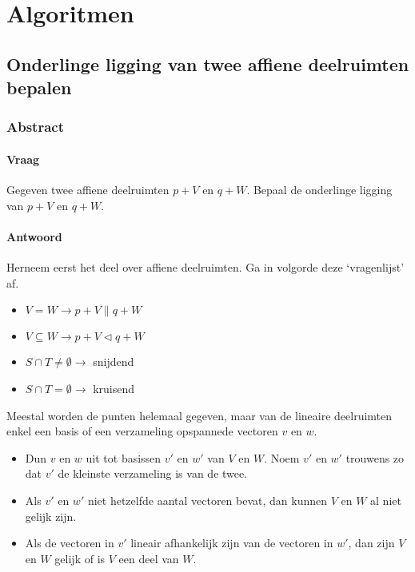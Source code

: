 \documentclass[main.tex]{subfiles}
\begin{document}
\chapter{Algoritmen}
\label{cha:algoritmen}

\section{Onderlinge ligging van twee affiene deelruimten bepalen}
\subsection*{Abstract}
\subsubsection*{Vraag}

\begin{center}
  Gegeven twee affiene deelruimten $p+V$ en $q+W$.
  Bepaal de onderlinge ligging van $p+V$ en $q+W$.
\end{center}

\subsubsection*{Antwoord}
Herneem eerst het deel over affiene deelruimten.
Ga in volgorde deze `vragenlijst' af.
\begin{itemize}
\item $V = W \rightarrow p+V \parallel q+W$
\item $V \subseteq W \rightarrow p+V \triangleleft q+W$
\item $S \cap T \neq \emptyset \rightarrow $ snijdend
\item $S \cap T = \emptyset \rightarrow $ kruisend
\end{itemize}

Meestal worden de punten helemaal gegeven, maar van de lineaire deelruimten enkel een basis of een verzameling opspannede vectoren $v$ en $w$.

\begin{itemize}
\item Dun $v$ en $w$ uit tot basissen $v'$ en $w'$ van $V$ en $W$.
  Noem $v'$ en $w'$ trouwens zo dat $v'$ de kleinste verzameling is van de twee.
\item Als $v'$ en $w'$ niet hetzelfde aantal vectoren bevat, dan kunnen $V$ en $W$ al niet gelijk zijn.
\item Als de vectoren in $v'$ lineair afhankelijk zijn van de vectoren in $w'$, dan zijn $V$ en $W$ gelijk of is $V$ een deel van $W$.
\end{itemize}
\end{document}
